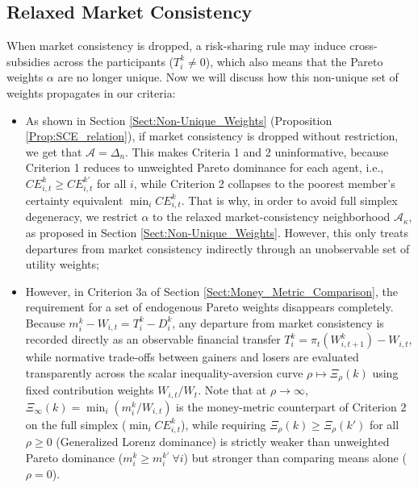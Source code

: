 \documentclass[11pt,a4paper]{article}
\theoremstyle{definition}
\theoremstyle{plain}
\theoremstyle{remark}
\newcommand{\1}{\mathbf{1}}
\begin{document}
\subsection{Relaxed Market Consistency}
When market consistency is dropped, a risk-sharing rule may induce cross-subsidies across the participants ($T_i^k \neq 0$), which also means that the Pareto weights $\alpha$ are no longer unique. Now we will discuss how this non-unique set of weights propagates in our criteria:
\begin{itemize}
    \item As shown in Section \ref{Sect:Non-Unique_Weights} (Proposition \ref{Prop:SCE_relation}), if market consistency is dropped without restriction, we get that $\mathcal{A} = \Delta_n$. This makes Criteria 1 and 2 uninformative, because Criterion 1 reduces to unweighted Pareto dominance for each agent, i.e., $CE_{i,t}^k \geq CE_{i,t}^{k'}$ for all $i$, while Criterion 2 collapses to the poorest member's certainty equivalent $\min_i CE_{i,t}^k$. That is why, in order to avoid full simplex degeneracy, we restrict $\alpha$ to the relaxed market-consistency neighborhood $\mathcal{A}_{\kappa}$, as proposed in Section \ref{Sect:Non-Unique_Weights}. However, this only treats departures from market consistency indirectly through an unobservable set of utility weights;
    \item However, in Criterion 3a of Section \ref{Sect:Money_Metric_Comparison}, the requirement for a set of endogenous Pareto weights disappears completely. Because $m_i^k - W_{i,t} = T_i^k - D_i^k$, any departure from market consistency is recorded directly as an observable financial transfer $T_i^k = \pi_t(W_{i,t+1}^k) - W_{i,t}$, while normative trade-offs between gainers and losers are evaluated transparently across the scalar inequality-aversion curve $\rho \mapsto \Xi_\rho(k)$ using fixed contribution weights $W_{i,t}/W_t$. Note that at $\rho \to \infty$, $\Xi_\infty(k) = \min_i (m_i^k / W_{i,t})$ is the money-metric counterpart of Criterion 2 on the full simplex ($\min_i CE_{i,t}^k$), while requiring $\Xi_\rho(k) \geq \Xi_\rho(k')$ for all $\rho \geq 0$ (Generalized Lorenz dominance) is strictly weaker than unweighted Pareto dominance ($m_i^k \geq m_i^{k'} \ \forall i$) but stronger than comparing means alone ($\rho = 0$).
\end{itemize}
\end{document}

